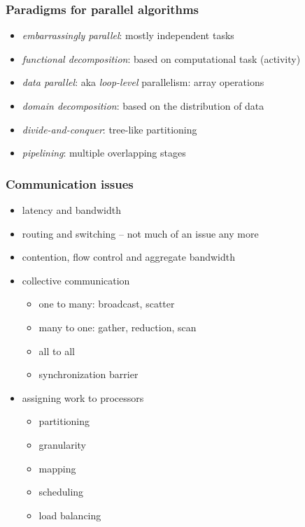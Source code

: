 \begin{frame}[fragile]
%
  \frametitle{Paradigms for parallel algorithms}
%
  \begin{itemize}
%
  \item {\em embarrassingly parallel}: mostly independent tasks
  \item {\em functional decomposition}: based on computational task (activity)
  \item {\em data parallel}: aka {\em loop-level} parallelism: array operations
  \item {\em domain decomposition}: based on the distribution of data
  \item {\em divide-and-conquer}: tree-like partitioning
  \item {\em pipelining}: multiple overlapping stages
%
  \end{itemize}
%
\end{frame}

\begin{frame}[fragile]
%
  \frametitle{Communication issues}
%
  \begin{itemize}
%
  \item latency and bandwidth
  \item routing and switching -- not much of an issue any more
  \item contention, flow control and aggregate bandwidth
  \item collective communication
    \begin{itemize}
      \item one to many: broadcast, scatter
      \item many to one: gather, reduction, scan
      \item all to all
      \item synchronization barrier
    \end{itemize}
  \item assigning work to processors
    \begin{itemize}
    \item partitioning
    \item granularity
    \item mapping
    \item scheduling
    \item load balancing
    \end{itemize}
%
  \end{itemize}
%
\end{frame}

